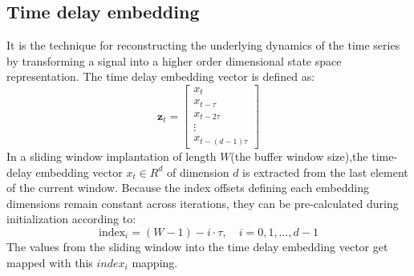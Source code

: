 \subsection{Time delay embedding}
It is the technique for reconstructing the underlying dynamics of the time series by transforming a signal into a higher order dimensional state space representation. The time delay embedding vector is defined as: 
\begin{equation}
\mathbf{z}_t = \begin{bmatrix}
x_t \\
x_{t-\tau} \\
x_{t-2\tau} \\
\vdots \\
x_{t-(d-1)\tau}
\end{bmatrix} 
\label{eq:tde_definition}
\end{equation}
In a sliding window implantation of length $W$(the buffer window size),the time-delay embedding vector $x_t \in R^d$ of dimension $d$ is extracted from the last element of the current window. Because the index offsets defining each embedding dimensions remain constant across iterations, they can be pre-calculated during initialization according to:
\begin{equation}
\text{index}_i = (W - 1) - i \cdot \tau, \quad i = 0, 1, \ldots, d-1
\label{eq:tde_indices}
\end{equation}
The values from the sliding window into the time delay embedding vector get mapped with this $index_i$ mapping. 